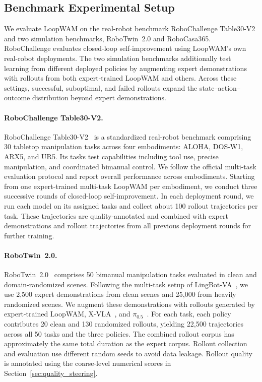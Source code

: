 \subsection{Benchmark Experimental Setup}
\label{sec:benchmark_setup}

We evaluate LoopWAM on the real-robot benchmark RoboChallenge Table30-V2 and two simulation benchmarks, RoboTwin~2.0 and RoboCasa365.
RoboChallenge evaluates closed-loop self-improvement using LoopWAM's own real-robot deployments.
The two simulation benchmarks additionally test learning from different deployed policies by augmenting expert demonstrations with rollouts from both expert-trained LoopWAM and others.
Across these settings, successful, suboptimal, and failed rollouts expand the state--action--outcome distribution beyond expert demonstrations.

\paragraph{RoboChallenge Table30-V2.}
RoboChallenge Table30-V2~\citep{robochallenge2026table30v2} is a standardized real-robot benchmark comprising 30 tabletop manipulation tasks across four embodiments: ALOHA, DOS-W1, ARX5, and UR5.
Its tasks test capabilities including tool use, precise manipulation, and coordinated bimanual control.
We follow the official multi-task evaluation protocol and report overall performance across embodiments.
Starting from one expert-trained multi-task LoopWAM per embodiment, we conduct three successive rounds of closed-loop self-improvement.
In each deployment round, we run each model on its assigned tasks and collect about 100 rollout trajectories per task.
These trajectories are quality-annotated and combined with expert demonstrations and rollout trajectories from all previous deployment rounds for further training.

\paragraph{RoboTwin~2.0.}
RoboTwin~2.0~\citep{chen2025robotwin2} comprises 50 bimanual manipulation tasks evaluated in clean and domain-randomized scenes.
Following the multi-task setup of LingBot-VA~\citep{lingbot-va2026}, we use 2,500 expert demonstrations from clean scenes and 25,000 from heavily randomized scenes.
We augment these demonstrations with rollouts generated by expert-trained LoopWAM, X-VLA~\citep{zheng2025xvla}, and $\pi_{0.5}$~\citep{physicalintelligence2025pi05}.
For each task, each policy contributes 20 clean and 130 randomized rollouts, yielding 22,500 trajectories across all 50 tasks and the three policies.
The combined rollout corpus has approximately the same total duration as the expert corpus.
Rollout collection and evaluation use different random seeds to avoid data leakage.
Rollout quality is annotated using the coarse-level numerical scores in Section~\ref{sec:quality_steering}.

